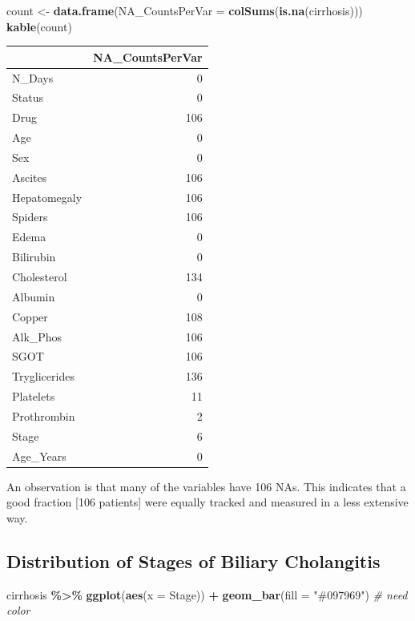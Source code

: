 \documentclass[
]{article}
\newenvironment{Shaded}{\begin{snugshade}}{\end{snugshade}}
\newcommand{\AttributeTok}[1]{\textcolor[rgb]{0.13,0.29,0.53}{#1}}
\newcommand{\CommentTok}[1]{\textcolor[rgb]{0.56,0.35,0.01}{\textit{#1}}}
\newcommand{\FunctionTok}[1]{\textcolor[rgb]{0.13,0.29,0.53}{\textbf{#1}}}
\newcommand{\NormalTok}[1]{#1}
\newcommand{\OtherTok}[1]{\textcolor[rgb]{0.56,0.35,0.01}{#1}}
\newcommand{\SpecialCharTok}[1]{\textcolor[rgb]{0.81,0.36,0.00}{\textbf{#1}}}
\newcommand{\StringTok}[1]{\textcolor[rgb]{0.31,0.60,0.02}{#1}}
\begin{document}
\begin{Shaded}
\begin{Highlighting}[]
\NormalTok{count }\OtherTok{\textless{}{-}}  \FunctionTok{data.frame}\NormalTok{(}\AttributeTok{NA\_CountsPerVar =} \FunctionTok{colSums}\NormalTok{(}\FunctionTok{is.na}\NormalTok{(cirrhosis)))}
\FunctionTok{kable}\NormalTok{(count)}
\end{Highlighting}
\end{Shaded}

\begin{tabular}{l|r}
\hline
  & NA\_CountsPerVar\\
\hline
N\_Days & 0\\
\hline
Status & 0\\
\hline
Drug & 106\\
\hline
Age & 0\\
\hline
Sex & 0\\
\hline
Ascites & 106\\
\hline
Hepatomegaly & 106\\
\hline
Spiders & 106\\
\hline
Edema & 0\\
\hline
Bilirubin & 0\\
\hline
Cholesterol & 134\\
\hline
Albumin & 0\\
\hline
Copper & 108\\
\hline
Alk\_Phos & 106\\
\hline
SGOT & 106\\
\hline
Tryglicerides & 136\\
\hline
Platelets & 11\\
\hline
Prothrombin & 2\\
\hline
Stage & 6\\
\hline
Age\_Years & 0\\
\hline
\end{tabular}

An observation is that many of the variables have 106 NAs. This
indicates that a good fraction {[}106 patients{]} were equally tracked
and measured in a less extensive way.

\hypertarget{distribution-of-stages-of-biliary-cholangitis}{%
\subsection{Distribution of Stages of Biliary
Cholangitis}\label{distribution-of-stages-of-biliary-cholangitis}}

\begin{Shaded}
\begin{Highlighting}[]
\NormalTok{cirrhosis }\SpecialCharTok{\%\textgreater{}\%}
      \FunctionTok{ggplot}\NormalTok{(}\FunctionTok{aes}\NormalTok{(}\AttributeTok{x =}\NormalTok{ Stage)) }\SpecialCharTok{+} \FunctionTok{geom\_bar}\NormalTok{(}\AttributeTok{fill =} \StringTok{"\#097969"}\NormalTok{) }\CommentTok{\# need color}
\end{Highlighting}
\end{Shaded}
\end{document}
